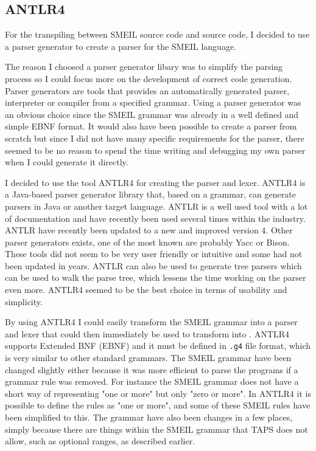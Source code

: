 \subsection{ANTLR4}
For the transpiling between SMEIL source code and \cspm{} source code, I decided to use a parser generator to create a parser for the SMEIL language.

The reason I choosed a parser generator libary was to simplify the parsing process so I could focus more on the development of correct code generation. Parser generators are tools that provides an automatically generated parser, interpreter or compiler from a specified grammar. Using a parser generator was an obvious choice since the SMEIL grammar was already in a well defined and simple EBNF format. It would also have been possible to create a parser from scratch but since I did not have many specific requirements for the parser, there seemed to be no reason to spend the time writing and debugging my own parser when I could generate it directly.

I decided to use the tool ANTLR4 for creating the parser and lexer. ANTLR4 is a Java-based parser generator library that, based on a grammar, can generate parsers in Java or another target language. ANTLR is a well used tool with a lot of documentation and have recently been used several times within the industry. ANTLR have recently been updated to a new and improved version 4. Other parser generators exists, one of the most known are probably Yacc or Bison. These tools did not seem to be very user friendly or intuitive and some had not been updated in years. ANTLR can also be used to generate tree parsers which can be used to walk the parse tree, which lessens the time working on the parser even more. ANTLR4 seemed to be the best choice in terms of usability and simplicity.

By using ANTLR4 I could easily transform the SMEIL grammar into a parser and lexer that could then immediately be used to transform into \cspm{}.
ANTLR4 supports Extended BNF (EBNF) and it must be defined in \texttt{.g4} file format, which is very similar to other standard grammars. The SMEIL grammar have been changed slightly either because it was more efficient to parse the programs if a grammar rule was removed. For instance the SMEIL grammar does not have a short way of representing "one or more" but only "zero or more". In ANTLR4 it is possible to define the rules as "one or more", and some of these SMEIL rules have been simplified to this. The grammar have also been changes in a few places, simply because there are things within the SMEIL grammar that TAPS does not allow, such as optional ranges, as described earlier.\\

